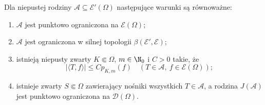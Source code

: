 \begin{twierdzenie}
\label{thm:dt-Eprime-bounded}
Dla niepustej rodziny $\mathcal A\subseteq\mathcal E'(\Omega)$
następujące warunki są równoważne:
\begin{enumerate}
 \item $\mathcal A$ jest punktowo ograniczona na $\mathcal E(\Omega)$;
 \item $\mathcal A$ jest ograniczona w silnej topologii
 $\beta(\mathcal E',\mathcal E)$;
 \item istnieją niepusty zwarty $K\Subset\Omega$,
 $m\in\N_0$ i $C>0$ takie, że
 \[
  |\langle T,f\rangle|\le C p_{K,m}(f)
  \quad(T\in\mathcal A,\ f\in\mathcal E(\Omega));
 \]
 \item istnieje zwarty $S\Subset\Omega$ zawierający
 nośniki wszystkich $T\in\mathcal A$, a rodzina
 $J(\mathcal A)$ jest punktowo ograniczona na $\mathcal D(\Omega)$.
\end{enumerate}
\end{twierdzenie}
